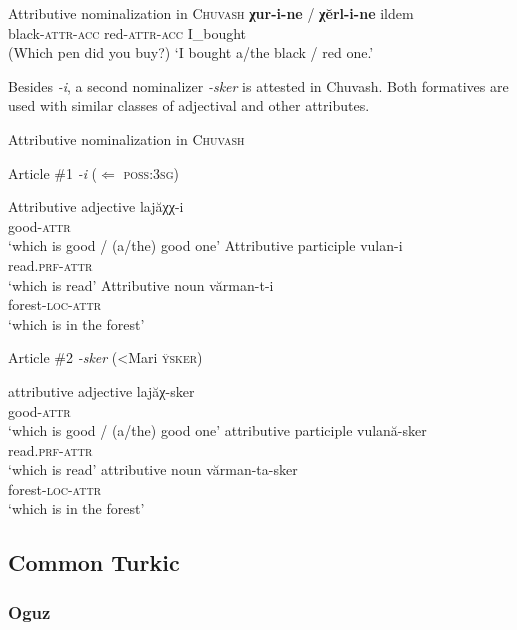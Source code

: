 \begin{exe}
\ex Attributive nominalization in \textsc{Chuvash} \citep[7]{benzing1993b} \label{chuvash headless acc}	
\gll	\textbf{χur-i-ne} / \textbf{χĕrl-i-ne} ildem\\
 	black-\textsc{attr}-\textsc{acc} { } red-\textsc{attr}-\textsc{acc} I\_bought\\
\glt 	(Which pen did you buy?) ‘I bought a/the black / red one.’
\end{exe}
Besides \textit{-i}, a second nominalizer \textit{-sker} is attested in Chuvash. Both formatives are used with similar classes of adjectival and other attributes.
\begin{exe}
\ex Attributive nominalization in \textsc{Chuvash} \citep{krueger1961}
\begin{xlist}
\ex Article \#1 \textit{-i} ($\Leftarrow$ \textsc{poss:3sg})
\begin{xlist}
\ex	Attributive adjective
\gll	lajăχχ-i\\
	good-\textsc{attr}\\
\glt	‘which is good / (a/the) good one’
\ex	Attributive participle
\gll	vulan-i\\
	read.\textsc{prf}-\textsc{attr}\\
\glt	‘which is read’
\ex	Attributive noun
\gll	vărman-t-i\\
	forest-\textsc{loc}-\textsc{attr}\\
\glt	‘which is in the forest’
\end{xlist}
\ex Article \#2 \textit{-sker} (<Mari \textsc{ÿsker})
\begin{xlist}
\ex	attributive adjective
\gll	lajăχ-sker\\
	good-\textsc{attr}\\
\glt	‘which is good / (a/the) good one’
\ex	attributive participle
\gll	vulană-sker\\
	read.\textsc{prf}-\textsc{attr}\\
\glt	‘which is read’
\ex	attributive noun
\gll	vărman-ta-sker\\
	forest-\textsc{loc}-\textsc{attr}\\
\glt	‘which is in the forest’
\end{xlist}
\end{xlist}
\end{exe}

\subsection{Common Turkic}
\subsubsection{Oguz}
